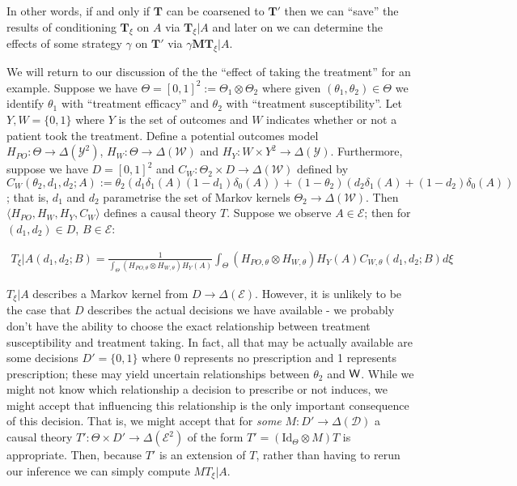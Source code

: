 In other words, if and only if $\mathbf{T}$ can be coarsened to $\mathbf{T}'$ then we can ``save'' the results of conditioning $\mathbf{T}_\xi$ on $A$ via $\mathbf{T}_\xi|A$ and later on we can determine the effects of some strategy $\gamma$ on $\mathbf{T}'$ via $\gamma \mathbf{M} \mathbf{T}_\xi|A$.

We will return to our discussion of the the ``effect of taking the treatment'' for an example. Suppose we have $\Theta=[0,1]^2:=\Theta_1\otimes \Theta_2$ where given $(\theta_1,\theta_2)\in\Theta$ we identify $\theta_1$ with ``treatment efficacy'' and $\theta_2$ with ``treatment susceptibility''. Let $Y,W=\{0,1\}$ where $Y$ is the set of outcomes and $W$ indicates whether or not a patient took the treatment. Define a potential outcomes model $H_{PO}:\Theta\to \Delta(\mathcal{Y}^2)$, $H_W:\Theta\to \Delta(\mathcal{W})$ and $H_Y:W\times Y^2\to \Delta(\mathcal{Y})$. Furthermore, suppose we have $D=[0,1]^2$ and $C_W:\Theta_2\times D\to \Delta(\mathcal{W})$ defined by $C_W(\theta_2,d_1,d_2;A):= \theta_2(d_1\delta_1(A) (1-d_1)\delta_0(A)) + (1-\theta_2)(d_2\delta_1(A)+(1-d_2)\delta_0(A))$; that is, $d_1$ and $d_2$ parametrise the set of Markov kernels $\Theta_2\to \Delta(\mathcal{W})$. Then $\langle H_{PO},H_W,H_Y,C_W\rangle$ defines a causal theory $T$. Suppose we observe $A\in \mathcal{E}$; then for $(d_1,d_2)\in D$, $B\in \mathcal{E}$:

\begin{align}
	T_\xi|A (d_1,d_2;B) = \frac{1}{\int_\Theta (H_{PO,\theta}\otimes H_{W,\theta})H_Y(A)}\int_\Theta (H_{PO,\theta}\otimes H_{W,\theta})H_Y(A) C_{W,\theta} (d_1,d_2;B) d\xi
\end{align}

$T_\xi|A$ describes a Markov kernel from $D\to \Delta(\mathcal{E})$. However, it is unlikely to be the case that $D$ describes the actual decisions we have available - we probably don't have the ability to choose the exact relationship between treatment susceptibility and treatment taking. In fact, all that may be actually available are some decisions $D'=\{0,1\}$ where 0 represents no prescription and 1 represents prescription; these may yield uncertain relationships between $\theta_2$ and $\mathsf{W}$. While we might not know which relationship a decision to prescribe or not induces, we might accept that influencing this relationship is the only important consequence of this decision. That is, we might accept that for \emph{some} $M:D'\to \Delta(\mathcal{D})$ a causal theory $T':\Theta\times D'\to \Delta(\mathcal{E}^2)$ of the form $T' = (\mathrm{Id}_\Theta\otimes M)T$ is appropriate. Then, because $T'$ is an extension of $T$, rather than having to rerun our inference we can simply compute $MT_\xi|A$.

